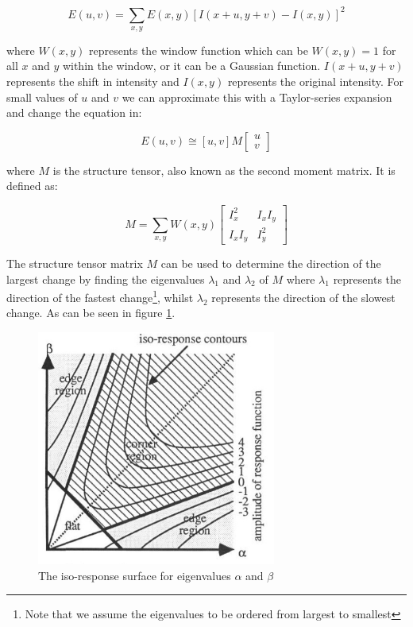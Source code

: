 \documentclass[a4paper,10pt]{article}
\begin{document}
\[E(u,v) = \sum_{x,y} E(x,y) [I(x+u,y+v) - I(x,y)]^2\]

where $W(x,y)$ represents the window function which can be $W(x,y)=1$ for all $x$ and $y$ within the window, or it can be a Gaussian function. $I(x+u, y+v)$ represents the shift in intensity and $I(x,y)$ represents the original intensity. For small values of $u$ and $v$ we can approximate this with a Taylor-series expansion and change the equation in:

\[E(u,v) \cong [u,v] M  \left[\begin{array}{c} u\\ v \end{array}\right] \]

where $M$ is the structure tensor, also known as the second moment matrix. It is defined as:

\[M = \sum_{x,y} W(x,y)  \begin{bmatrix}I^2_x & I_x I_y \\ I_x I_y &  I^2_y \end{bmatrix} \]

The structure tensor matrix $M$ can be used to determine the direction of the largest change by finding the eigenvalues $\lambda_1$ and $\lambda_2$ of $M$ where $\lambda_1$ represents the direction of the fastest change\footnote{Note that we assume the eigenvalues to be ordered from largest to smallest}, whilst $\lambda_2$ represents the direction of the slowest change. As can be seen in figure \ref{fig:isoresponse}.

\begin{figure}[ht]
\centering
\includegraphics[width=0.7\textwidth]{img/isoresponse}
\caption{The iso-response surface for eigenvalues $\alpha$ and $\beta$ \cite{Harris1988}}
\label{fig:isoresponse}
\end{figure}
\end{document}
